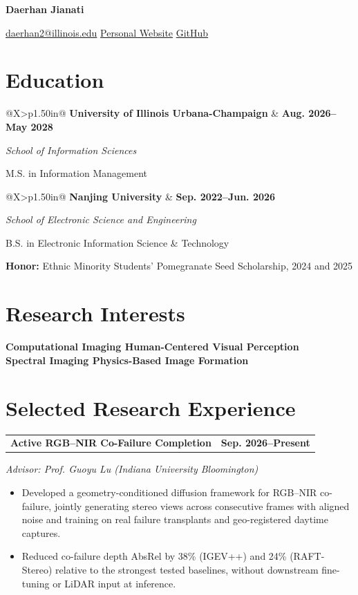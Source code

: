 \documentclass[11pt,letterpaper]{article}
\makeatletter
\newlength{\entryspacing}
\newcommand{\headerlink}[2]{\href{#1}{#2}}
\newcommand{\datefont}[1]{{\fontsize{9.6}{13.5}\selectfont\bfseries\leavevmode\color{dateblue}#1}}
\newcommand{\entryheader}[2]{%
  \noindent\begin{tabularx}{\linewidth}{@{}X>{\raggedleft\arraybackslash}p{1.50in}@{}}
    {\fontsize{11}{14}\selectfont\bfseries #1} & \datefont{#2}
  \end{tabularx}\par
}
\newcommand{\researchentry}[3]{%
  \Needspace{5\baselineskip}%
  \entryheader{#1}{#2}%
  \vspace{2pt}%
  {\fontsize{10}{13}\selectfont\itshape #3\par}%
}
\newcommand{\educationentry}[4]{%
  \entryheader{#1}{#2}%
  \vspace{2pt}%
  {\fontsize{10}{13}\selectfont\itshape #3\par}%
  {\fontsize{11}{14.3}\selectfont #4\par}%
}
\newcommand{\tightbullets}{%
  \begin{itemize}[leftmargin=1.15em,labelsep=0.40em,itemsep=2pt,topsep=3pt,parsep=0pt,partopsep=0pt]
}
\newcommand{\tightbulletsend}{\end{itemize}}
\newcommand{\entrygap}{\par\vspace{\entryspacing}}
\makeatother
\begin{document}
\fontsize{11}{14.3}\selectfont
\color{bodygray}

{\centering
  {\fontsize{23.5}{27}\selectfont\bfseries\color{navy}Daerhan Jianati\par}
  \vspace{5pt}
  {\fontsize{10}{13}\selectfont
    \href{mailto:daerhan2@illinois.edu}{daerhan2@illinois.edu}
    \enspace\textbar\enspace
    \headerlink{https://darhan7.github.io/home/}{Personal Website}
    \enspace\textbar\enspace
    \headerlink{https://github.com/Darhan7}{GitHub}\par
  }
}
\vspace{5pt}

\section{Education}
\educationentry
  {University of Illinois Urbana-Champaign}
  {Aug. 2026--May 2028}
  {School of Information Sciences}
  {M.S. in Information Management}

\entrygap

\educationentry
  {Nanjing University}
  {Sep. 2022--Jun. 2026}
  {School of Electronic Science and Engineering}
  {B.S. in Electronic Information Science \& Technology}
{\fontsize{10}{13}\selectfont\textbf{Honor:} Ethnic Minority Students' Pomegranate Seed Scholarship, 2024 and 2025\par}

\section{Research Interests}
{\fontsize{11}{14.3}\selectfont\bfseries
  Computational Imaging \enspace\textbar\enspace
  Human-Centered Visual Perception\\[2pt]
  Spectral Imaging \enspace\textbar\enspace
  Physics-Based Image Formation\par
}

\section{Selected Research Experience}

\researchentry
  {Active RGB--NIR Co-Failure Completion}
  {Sep. 2026--Present}
  {Advisor: Prof. Guoyu Lu (Indiana University Bloomington)}
\tightbullets
  \item Developed a geometry-conditioned diffusion framework for RGB--NIR co-failure, jointly generating stereo views across consecutive frames with aligned noise and training on real failure transplants and geo-registered daytime captures.
  \item Reduced co-failure depth AbsRel by 38\% (IGEV++) and 24\% (RAFT-Stereo) relative to the strongest tested baselines, without downstream fine-tuning or LiDAR input at inference.
\tightbulletsend
\end{document}

